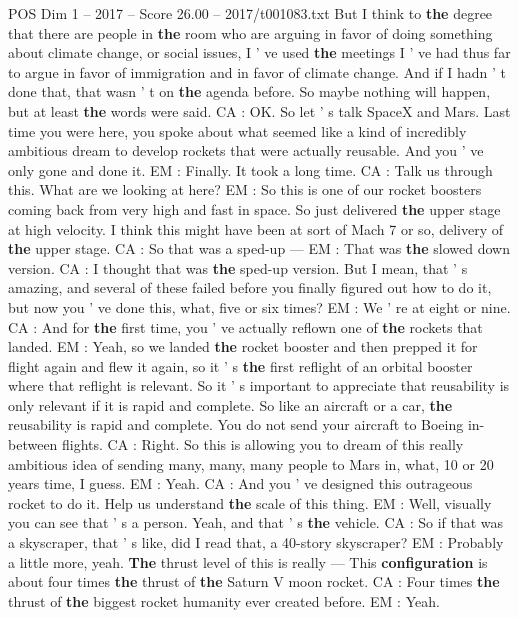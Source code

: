 \begin{textsample}{POS Dim 1 – 2017 – Score 26.00 – 2017/t001083.txt}
But I think to \textbf{the} degree that there are people in \textbf{the} room who are arguing in favor of doing something about climate change, or social issues, I ' ve used \textbf{the} meetings I ' ve had thus far to argue in favor of immigration and in favor of climate change.
And if I hadn ' t done that, that wasn ' t on \textbf{the} agenda before.
So maybe nothing will happen, but at least \textbf{the} words were said.
CA : OK.
So let ' s talk SpaceX and Mars.
Last time you were here, you spoke about what seemed like a kind of incredibly ambitious dream to develop rockets that were actually reusable.
And you ' ve only gone and done it.
EM : Finally.
It took a long time.
CA : Talk us through this.
What are we looking at here?
EM : So this is one of our rocket boosters coming back from very high and fast in space.
So just delivered \textbf{the} upper stage at high velocity.
I think this might have been at sort of Mach 7 or so, delivery of \textbf{the} upper stage.
CA : So that was a sped-up — EM : That was \textbf{the} slowed down version.
CA : I thought that was \textbf{the} sped-up version.
But I mean, that ' s amazing, and several of these failed before you finally figured out how to do it, but now you ' ve done this, what, five or six times?
EM : We ' re at eight or nine.
CA : And for \textbf{the} first time, you ' ve actually reflown one of \textbf{the} rockets that landed.
EM : Yeah, so we landed \textbf{the} rocket booster and then prepped it for flight again and flew it again, so it ' s \textbf{the} first reflight of an orbital booster where that reflight is relevant.
So it ' s important to appreciate that reusability is only relevant if it is rapid and complete.
So like an aircraft or a car, \textbf{the} reusability is rapid and complete.
You do not send your aircraft to Boeing in- between flights.
CA : Right.
So this is allowing you to dream of this really ambitious idea of sending many, many, many people to Mars in, what, 10 or 20 years time, I guess.
EM : Yeah.
CA : And you ' ve designed this outrageous rocket to do it.
Help us understand \textbf{the} scale of this thing.
EM : Well, visually you can see that ' s a person.
Yeah, and that ' s \textbf{the} vehicle.
CA : So if that was a skyscraper, that ' s like, did I read that, a 40-story skyscraper?
EM : Probably a little more, yeah. \textbf{The} thrust level of this is really — This \textbf{configuration} is about four times \textbf{the} thrust of \textbf{the} Saturn V moon rocket.
CA : Four times \textbf{the} thrust of \textbf{the} biggest rocket humanity ever created before.
EM : Yeah.

\end{textsample}
